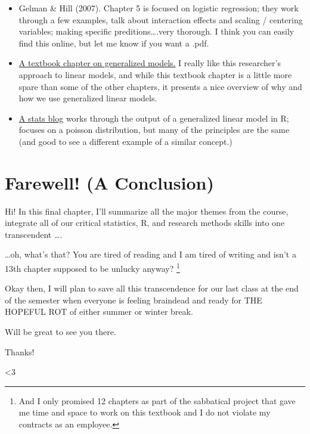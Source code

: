 \documentclass[
  letterpaper,
  DIV=11,
  numbers=noendperiod,
  oneside]{scrreprt}
\providecommand{\tightlist}{%
  \setlength{\itemsep}{0pt}\setlength{\parskip}{0pt}}\usepackage{longtable,booktabs,array}
\begin{document}
\begin{itemize}
\tightlist
\item
  Gelman \& Hill (2007). Chapter 5 is focused on logistic regression;
  they work through a few examples, talk about interaction effects and
  scaling / centering variables; making specific preditions\ldots.very
  thorough. I think you can easily find this online, but let me know if
  you want a .pdf.
\item
  \href{https://www.datascienceblog.net/post/machine-learning/interpreting_generalized_linear_models/}{A
  textbook chapter on generalized models.} I really like this
  researcher's approach to linear models, and while this textbook
  chapter is a little more spare than some of the other chapters, it
  presents a nice overview of why and how we use generalized linear
  models.
\item
  \href{https://www.datascienceblog.net/post/machine-learning/interpreting_generalized_linear_models/}{A
  stats blog} works through the output of a generalized linear model in
  R; focuses on a poisson distribution, but many of the principles are
  the same (and good to see a different example of a similar concept.)
\end{itemize}


\chapter{Farewell! (A Conclusion)}\label{farewell-a-conclusion}

Hi! In this final chapter, I'll summarize all the major themes from the
course, integrate all of our critical statistics, R, and research
methods skills into one transcendent \ldots.

\ldots oh, what's that? You are tired of reading and I am tired of
writing and isn't a 13th chapter supposed to be unlucky anyway?
\footnote{And I only promised 12 chapters as part of the sabbatical
  project that gave me time and space to work on this textbook and I do
  not violate my contracts as an employee.}

Okay then, I will plan to save all this transcendence for our last class
at the end of the semester when everyone is feeling braindead and ready
for THE HOPEFUL ROT of either summer or winter break.

Will be great to see you there.

Thanks!

\textless3
\end{document}
